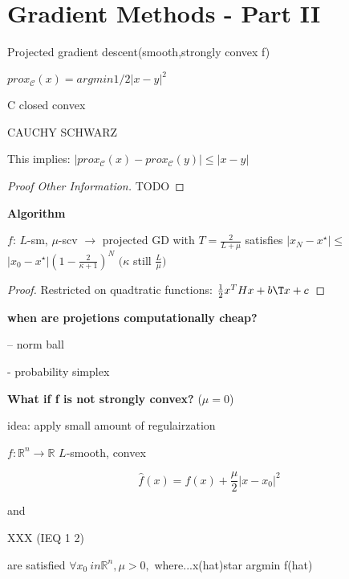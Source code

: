 \section{Gradient Methods - Part II}

Projected gradient descent(smooth,strongly convex f)

\begin{definition}[]
	$prox_\mathcal{C}(x)=argmin 1/2|x-y|^2$
\end{definition}

C closed convex

CAUCHY SCHWARZ

This implies:
$|prox_\mathcal{C}(x)-prox_\mathcal{C}(y)|\le|x-y|$

%

\begin{proof}[Proof Other Information]
	TODO
\end{proof}

\textbf{Algorithm}

\begin{proposition}
	$f$: $L$-sm, $\mu$-scv
	$\rightarrow$
	projected GD with
	$T=\frac{2}{L+\mu}$
	satisfies
	$|x_N - x^\star|\le$
	$|x_0 - x^\star|(1-\frac{2}{\kappa+1})^N$
	$(\kappa$ still $\frac{L}{\mu})$
\end{proposition}

\begin{proof}[Proof]
	Restricted on quadtratic functions:
	$\frac{1}{2}x^THx+b\T x +c$

\end{proof}

\textbf{when are projetions computationally cheap?}

-- norm ball

- probability simplex

\textbf{What if f is not strongly convex?} ($\mu=0$)

\rightarrow idea: apply small amount of regulairzation

$f: \mathbb{R}^{n}\rightarrow \mathbb{R}$ $L$-smooth, convex

\[\hat{f}(x) = f(x)+\frac{\mu}{2}|x-x_0|^2\]

and

XXX (IEQ 1 2)

are satisfied $\forall x_0 \ in \mathbb{R}^{n}, \mu > 0,$
where...x(hat)star argmin f(hat)

